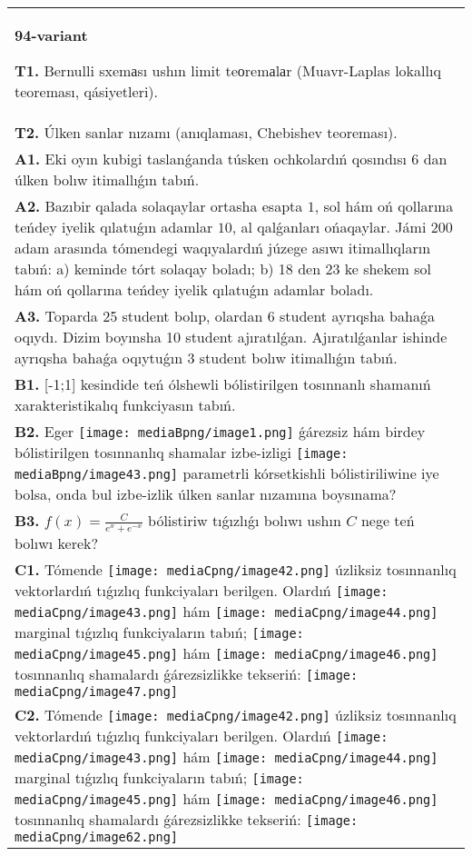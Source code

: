 \documentclass{article}
\begin{document}
\begin{tabular}{m{17cm}}
\textbf{94-variant}
\newline

\textbf{T1.} Bernulli sxemаsı ushın limit teоremаlаr (Muavr-Laplas lokallıq teoreması, qásiyetleri).
 \\
\textbf{T2.} 
Úlken sanlar nızamı (anıqlaması, Chebishev teoreması).
 \\
\textbf{A1.} Eki oyın kubigi taslanǵanda túsken ochkolardıń qosındısı 6 dan úlken bolıw itimallıǵın tabıń.
 \\
\textbf{A2.} Bazıbir qalada solaqaylar ortasha esapta $1$, sol hám oń qollarına teńdey iyelik qılatuǵın adamlar $10$, al qalǵanları ońaqaylar. Jámi 200 adam arasında tómendegi waqıyalardıń júzege asıwı itimallıqların tabıń: a) keminde tórt solaqay boladı; b) 18 den 23 ke shekem sol hám oń qollarına teńdey iyelik qılatuǵın adamlar boladı.
 \\
\textbf{A3.} Toparda 25 student bolıp, olardan 6 student ayrıqsha bahaǵa oqıydı. Dizim boyınsha 10 student ajıratılǵan. Ajıratılǵanlar ishinde ayrıqsha bahaǵa oqıytuǵın 3 student bolıw itimallıǵın tabıń.
 \\
\textbf{B1.} {[}-1;1{]} kesindide teń ólshewli bólistirilgen tosınnanlı shamanıń xarakteristikalıq funkciyasın tabıń.
 \\
\textbf{B2.} Eger \texttt{[image: mediaBpng/image1.png]} ǵárezsiz hám birdey bólistirilgen tosınnanlıq shamalar izbe-izligi \texttt{[image: mediaBpng/image43.png]} parametrli kórsetkishli bólistiriliwine iye bolsa, onda bul izbe-izlik úlken sanlar nızamına boysınama?
 \\
\textbf{B3.} \(f(x) = \frac{C}{e^{x} + e^{- x}}\) bólistiriw tıǵızlıǵı bolıwı ushın \(C\) nege teń bolıwı kerek?
 \\
\textbf{C1.} 
Tómende \texttt{[image: mediaCpng/image42.png]} úzliksiz tosınnanlıq vektorlardıń tıǵızlıq funkciyaları berilgen. Olardıń \texttt{[image: mediaCpng/image43.png]} hám \texttt{[image: mediaCpng/image44.png]} marginal tıǵızlıq funkciyaların tabıń; \texttt{[image: mediaCpng/image45.png]} hám \texttt{[image: mediaCpng/image46.png]} tosınnanlıq shamalardı ǵárezsizlikke tekseriń: \texttt{[image: mediaCpng/image47.png]}
 \\
\textbf{C2.} Tómende \texttt{[image: mediaCpng/image42.png]} úzliksiz tosınnanlıq vektorlardıń tıǵızlıq funkciyaları berilgen. Olardıń \texttt{[image: mediaCpng/image43.png]} hám \texttt{[image: mediaCpng/image44.png]} marginal tıǵızlıq funkciyaların tabıń; \texttt{[image: mediaCpng/image45.png]} hám \texttt{[image: mediaCpng/image46.png]} tosınnanlıq shamalardı ǵárezsizlikke tekseriń: \texttt{[image: mediaCpng/image62.png]}

\end{tabular}
\end{document}
